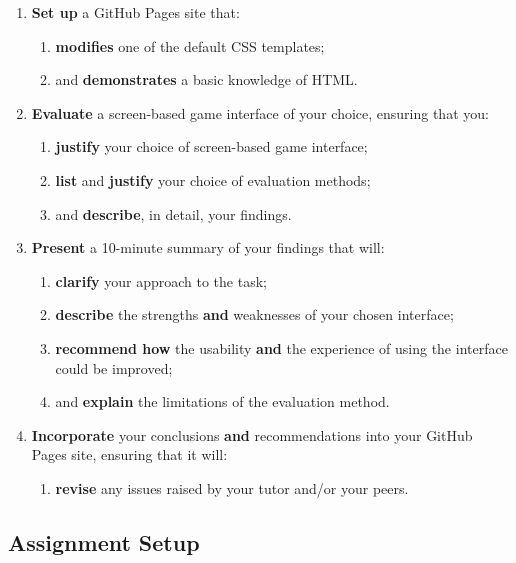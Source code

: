 \documentclass{../fal_assignment}
\begin{document}
\begin{enumerate}[label=(\alph*)]
    \item \textbf{Set up} a GitHub Pages site that:
    	\begin{enumerate}[label=\roman*.]
    		\item \textbf{modifies} one of the default CSS templates;
    		\item and \textbf{demonstrates} a basic knowledge of HTML.
	\end{enumerate}
    \item \textbf{Evaluate} a screen-based game interface of your choice, ensuring that you:
    	\begin{enumerate}[label=\roman*.]
    		\item \textbf{justify} your choice of screen-based game interface;
    		\item \textbf{list} and \textbf{justify} your choice of evaluation methods;
		\item and \textbf{describe}, in detail, your findings.
	\end{enumerate}
    \item \textbf{Present} a 10-minute summary of your findings that will:
    	\begin{enumerate}[label=\roman*.]
    		\item \textbf{clarify} your approach to the task;
    		\item \textbf{describe} the strengths \textbf{and} weaknesses of your chosen interface;
    		\item \textbf{recommend how} the usability \textbf{and} the experience of using the interface could be improved;
    		\item and \textbf{explain} the limitations of the evaluation method.
	\end{enumerate}
	\item \textbf{Incorporate} your conclusions \textbf{and} recommendations into your GitHub Pages site, ensuring that it will:
    	\begin{enumerate}[label=\roman*.]
    		\item \textbf{revise} any issues raised by your tutor and/or your peers.		
	\end{enumerate}
\end{enumerate}

\subsection*{Assignment Setup}
\end{document}

